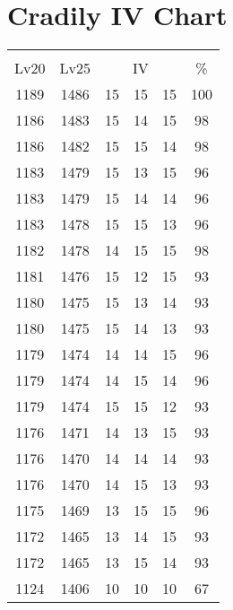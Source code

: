 \documentclass{article}%
\begin{document}
%
\normalsize%
\section{Cradily IV Chart}%
\label{sec:Cradily IV Chart}%
\renewcommand{\arraystretch}{1.5}%
\begin{tabular}{|c|c|c|c|c|c|}%
\hline%
\multicolumn{6}{|c|}{\textcolor{white}{ 
\linebreak{Cradily}
}%
\cellcolor{black}}\\%
\multicolumn{1}{|c}{Lv20}&\multicolumn{1}{c|}{Lv25}&\multicolumn{3}{c|}{IV}&\multicolumn{1}{|c|}{\%}\\%
\hline%
\rowcolor{color100}%
1189&1486&15&15&15&100\\%
\hline%
\rowcolor{color98}%
1186&1483&15&14&15&98\\%
\hline%
\rowcolor{color98}%
1186&1482&15&15&14&98\\%
\hline%
\rowcolor{color96}%
1183&1479&15&13&15&96\\%
\hline%
\rowcolor{color96}%
1183&1479&15&14&14&96\\%
\hline%
\rowcolor{color96}%
1183&1478&15&15&13&96\\%
\hline%
\rowcolor{color98}%
1182&1478&14&15&15&98\\%
\hline%
\rowcolor{color93}%
1181&1476&15&12&15&93\\%
\hline%
\rowcolor{color93}%
1180&1475&15&13&14&93\\%
\hline%
\rowcolor{color93}%
1180&1475&15&14&13&93\\%
\hline%
\rowcolor{color96}%
1179&1474&14&14&15&96\\%
\hline%
\rowcolor{color96}%
1179&1474&14&15&14&96\\%
\hline%
\rowcolor{color93}%
1179&1474&15&15&12&93\\%
\hline%
\rowcolor{color93}%
1176&1471&14&13&15&93\\%
\hline%
\rowcolor{color93}%
1176&1470&14&14&14&93\\%
\hline%
\rowcolor{color93}%
1176&1470&14&15&13&93\\%
\hline%
\rowcolor{color96}%
1175&1469&13&15&15&96\\%
\hline%
\rowcolor{color93}%
1172&1465&13&14&15&93\\%
\hline%
\rowcolor{color93}%
1172&1465&13&15&14&93\\%
\hline%
\rowcolor{color91}%
1124&1406&10&10&10&67\\%
\end{tabular}

%
\end{document}
